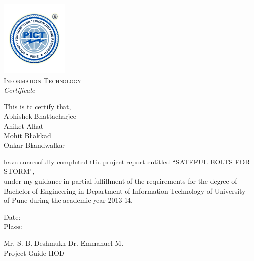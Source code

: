 \thispagestyle{plain} 
\begin{center}


\includegraphics[scale=0.5]{../img/logo} \\[2mm]

{\textsc{Information Technology}}  \\[5mm]
{\textit{Certificate}} \\[5mm]
\end{center} 

This is to certify that,\\[2mm]

\hspace*{14mm}Abhishek Bhattacharjee\\[2mm]
\hspace*{20mm}Aniket Alhat\\[2mm]
\hspace*{20mm}Mohit Bhakkad\\[2mm]
\hspace*{20mm}Onkar Bhandwalkar\\
\vspace*{8mm}  

have successfully completed this project report entitled  “SATEFUL BOLTS FOR STORM”, \\ under my guidance in partial fulfillment of the requirements for the degree of Bachelor of Engineering in Department of Information Technology of University of Pune during the academic year 2013-14.\\[18mm]
\begin{flushleft}
Date:\\[2mm]
Place:\\[18mm]
\end{flushleft}

Mr. S. B. Deshmukh     \hspace*{50mm}Dr. Emmanuel M.\\
\hspace*{10mm}Project Guide          \hspace*{70mm}HOD

